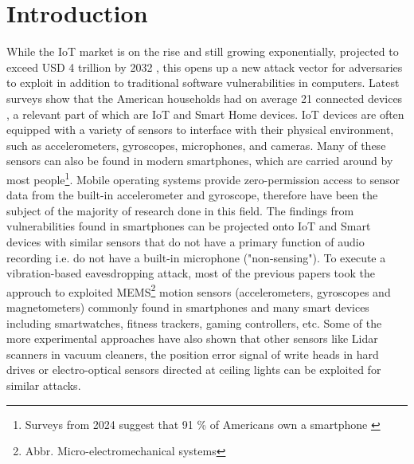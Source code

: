 \documentclass[sigconf, nonacm]{acmart}
\begin{document}




\maketitle

\section{Introduction}
While the IoT market is on the rise and still growing exponentially, projected to exceed USD 4 trillion by 2032 \cite{FortuneBusinessInsights2024}, this opens up a new attack vector for adversaries to exploit in addition to traditional software vulnerabilities in computers.
Latest surveys show that the American households had on average 21 connected devices \cite{DeloitteConnectedConsumer2023}, a relevant part of which are IoT and Smart Home devices.
IoT devices are often equipped with a variety of sensors to interface with their physical environment, such as accelerometers, gyroscopes, microphones, and cameras.
Many of these sensors can also be found in modern smartphones, which are carried around by most people\footnote{Surveys from 2024 suggest that 91 \% of Americans own a smartphone \cite{PewResearchMobileFactSheet2024}}. Mobile operating systems provide zero-permission access to sensor data from the built-in accelerometer and gyroscope, therefore have been the subject of the majority of research done in this field.
The findings from vulnerabilities found in smartphones can be projected onto IoT and Smart devices with similar sensors that do not have a primary function of audio recording i.e. do not have a built-in microphone ("non-sensing").
To execute a vibration-based eavesdropping attack, most of the previous papers took the approuch to exploited MEMS\footnote{Abbr. Micro-electromechanical systems} motion sensors (accelerometers, gyroscopes and magnetometers) commonly found in smartphones and many smart devices including smartwatches, fitness trackers, gaming controllers, etc.
Some of the more experimental approaches have also shown that other sensors like Lidar scanners in vacuum cleaners, the position error signal of write heads in hard drives or electro-optical sensors directed at ceiling lights can be exploited for similar attacks.
\end{document}
